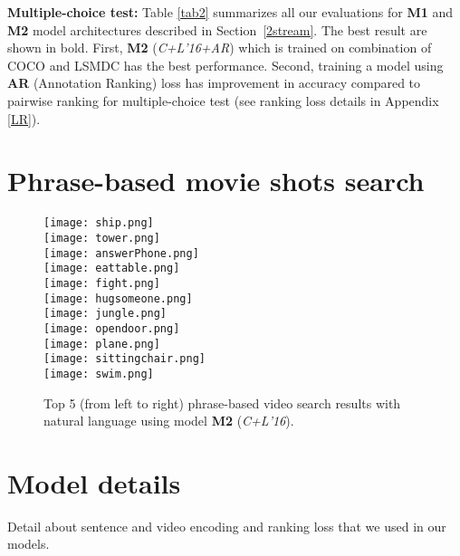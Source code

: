 \documentclass[runningheads]{llncs}
\begin{document}
\noindent
{\bf Multiple-choice test:}
Table \ref{tab2} summarizes all our evaluations for  \textbf{M1} and \textbf{M2} model architectures described in Section~\ref{2stream}. The best result are shown in bold.
First, \textbf{M2} (\textit{C+L'16+AR}) which is trained on combination of COCO and LSMDC has the best performance. Second, training a model using \textbf{AR} (Annotation Ranking) loss has  improvement in accuracy compared to pairwise ranking for multiple-choice test (see ranking loss details in Appendix \ref{LR}). 

\clearpage


\newpage
\appendix

\section{Phrase-based movie shots search}\label{App:AppendixA}

\begin{figure*}[!hb]
\begin{center}
\texttt{[image: ship.png]} \\
\texttt{[image: tower.png]} \\
\texttt{[image: answerPhone.png]} \\
\texttt{[image: eattable.png]} \\
\texttt{[image: fight.png]} \\
\texttt{[image: hugsomeone.png]} \\
\texttt{[image: jungle.png]} \\
\texttt{[image: opendoor.png]} \\
\texttt{[image: plane.png]} \\
\texttt{[image: sittingchair.png]} \\
\texttt{[image: swim.png]} \\
\end{center}
\vspace{-0.1in}
\label{fig:long3}
 \caption{Top 5 (from left to right) phrase-based video search results with natural language  using model \textbf{M2} (\textit{C+L'16}). }
\vspace{-0.2in}
\end{figure*}

\section{Model details}\label{App:AppendixB}
Detail about sentence and video encoding and ranking loss that we used in our models.
\end{document}
